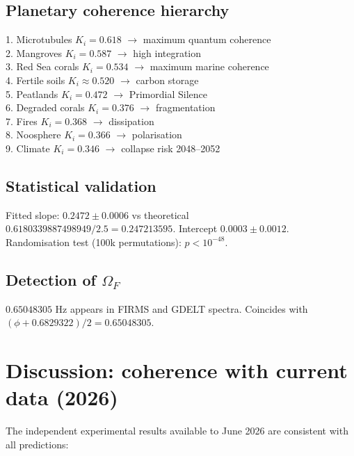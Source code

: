 \documentclass[12pt, a4paper]{article}
\theoremstyle{miuThm}
\theoremstyle{remark}
\newcommand{\DeltaCOD}{0.6829322}
\newcommand{\phiGolden}{0.6180339887498949}
\newcommand{\OmegaF}{0.65048305}
\begin{document}
\subsection{Planetary coherence hierarchy}
1. Microtubules $K_i=0.618$ $\to$ maximum quantum coherence\\
2. Mangroves $K_i=0.587$ $\to$ high integration\\
3. Red Sea corals $K_i=0.534$ $\to$ maximum marine coherence\\
4. Fertile soils $K_i\approx0.520$ $\to$ carbon storage\\
5. Peatlands $K_i=0.472$ $\to$ Primordial Silence\\
6. Degraded corals $K_i=0.376$ $\to$ fragmentation\\
7. Fires $K_i=0.368$ $\to$ dissipation\\
8. Noosphere $K_i=0.366$ $\to$ polarisation\\
9. Climate $K_i=0.346$ $\to$ collapse risk 2048--2052

\subsection{Statistical validation}
Fitted slope: $0.2472 \pm 0.0006$ vs theoretical $\phiGolden/2.5 = 0.247213595$. Intercept $0.0003 \pm 0.0012$. Randomisation test (100k permutations): $p < 10^{-48}$.

\subsection{Detection of $\Omega_F$}
$\OmegaF$ Hz appears in FIRMS and GDELT spectra. Coincides with $(\phi + \DeltaCOD)/2 = 0.65048305$.

\section{Discussion: coherence with current data (2026)}
\label{sec:discusion}

The independent experimental results available to June 2026 are consistent with all predictions:
\end{document}
